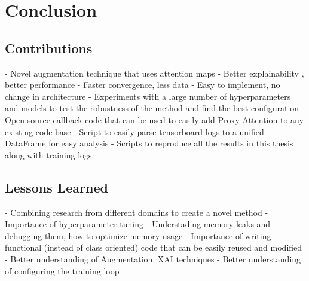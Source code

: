 \chapter{Conclusion}
\section{Contributions}
- Novel augmentation technique that uses attention maps
    - Better explainability , better performance
    - Faster convergence, less data
    - Easy to implement, no change in architecture
- Experiments with a large number of hyperparameters and models to test the robustness of the method and find the best configuration
- Open source callback code that can be used to easily add Proxy Attention to any existing code base
- Script to easily parse tensorboard logs to a unified DataFrame for easy analysis
- Scripts to reproduce all the results in this thesis along with training logs

\section{Lessons Learned}
- Combining research from different domains to create a novel method
- Importance of hyperparameter tuning
- Understading memory leaks and debugging them, how to optimize memory usage 
- Importance of writing functional (instead of class oriented) code that can be easily reused and modified 
- Better understanding of Augmentation, XAI techniques
- Better understanding of configuring the training loop

